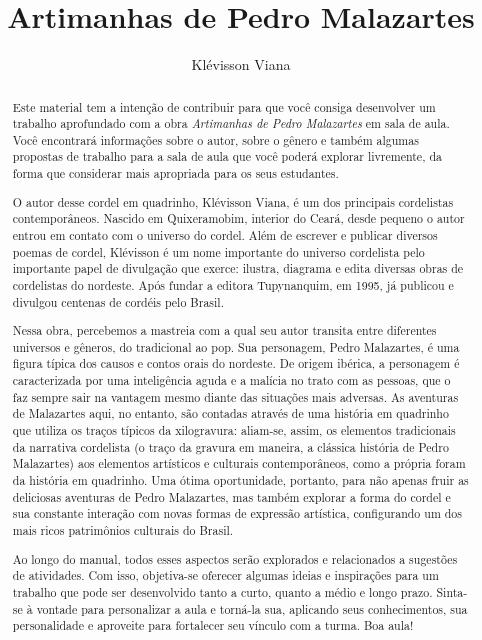 \documentclass[11pt]{extarticle}
\newcommand{\AutorLivro}{Klévisson Viana}
\newcommand{\TituloLivro}{Artimanhas de Pedro Malazartes}
\newcommand{\colaborador}{Paulo Pompermaier}
\begin{document}
\title{\TituloLivro}
\author{\AutorLivro}
\def\authornotes{\colaborador}

\date{}
\maketitle

\tableofcontents

\begin{abstract}
Este material tem a intenção de contribuir para que você consiga desenvolver um trabalho aprofundado com a obra \textit{Artimanhas de Pedro Malazartes} em sala de aula.
Você encontrará informações sobre o autor, sobre o gênero e também 
algumas propostas de trabalho para a sala de aula que você poderá explorar livremente, 
da forma que considerar mais apropriada para os seus estudantes.

O autor desse cordel em quadrinho, Klévisson Viana, é um dos principais cordelistas contemporâneos.
Nascido em Quixeramobim, interior do Ceará, desde pequeno o autor entrou em contato com o universo do cordel.
Além de escrever e publicar diversos poemas de cordel, Klévisson é um nome importante do universo cordelista pelo importante papel de divulgação que exerce: ilustra, diagrama e edita diversas obras de cordelistas do nordeste. 
Após fundar a editora Tupynanquim, em 1995, já publicou e divulgou centenas de cordéis pelo Brasil.

Nessa obra, percebemos a mastreia com a qual seu autor transita entre diferentes universos e gêneros, do tradicional ao pop. Sua personagem, Pedro Malazartes, é uma figura típica dos causos e contos orais do nordeste. De origem ibérica, a personagem é caracterizada por uma inteligência aguda e a malícia no trato com as pessoas, que o faz sempre sair na vantagem mesmo diante das situações mais adversas. As aventuras de Malazartes aqui, no entanto, são contadas através de uma história em quadrinho que utiliza os traços típicos da xilogravura: aliam-se, assim, os elementos tradicionais da narrativa cordelista (o traço da gravura em maneira, a clássica história de Pedro Malazartes) aos elementos artísticos e culturais contemporâneos, como a própria foram da história em quadrinho. Uma ótima oportunidade, portanto, para não apenas fruir as deliciosas aventuras de Pedro Malazartes, mas também explorar a forma do cordel e sua constante interação com novas formas de expressão artística, configurando um dos mais ricos patrimônios culturais do Brasil.

Ao longo do manual, todos esses aspectos serão explorados e relacionados a sugestões de atividades. Com isso, objetiva-se oferecer algumas ideias e inspirações para um trabalho que pode ser desenvolvido tanto a curto, quanto a médio e longo prazo. Sinta-se à vontade para personalizar a aula e torná-la sua, aplicando seus conhecimentos, sua 
personalidade e aproveite para fortalecer seu vínculo com a turma.
Boa aula!
\end{abstract}
\end{document}
